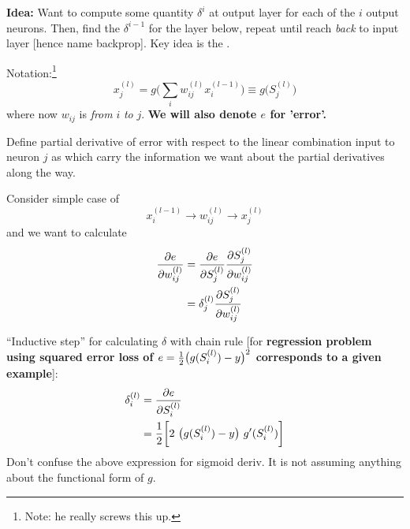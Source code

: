 \documentclass[12pt]{article}
\begin{document}
\begin{compactitem}[$\rightarrow$]
	\item \textbf{Idea:} Want to compute some quantity $\delta^i$ at output layer for each of the $i$ output neurons. Then, find the $\delta^{i - 1}$ for the layer below, repeat until reach \textit{back} to input layer [hence name backprop]. Key idea is the . 
	
	\item Notation:\footnote{Note: he really screws this up.}  $$ x_j^{(l)} = g\bigg( \sum_i w_{ij}^{(l)} x_i^{(l - 1)}\bigg)  \equiv g\bigg( S_j^{(l)}\bigg) $$ where now $w_{ij}$ is \textit{from} $i$ \textit{to} $j$. \textbf{We will also denote $e$ for 'error'. }
	
	\item Define partial derivative of error with respect to the linear combination input to neuron $j$ as
	which carry the information we want about the partial derivatives along the way. 
	
	\item Consider simple case of $$x_i^{(l - 1)} \rightarrow w_{ij}^{(l)} \rightarrow x_j^{(l)} $$ and we want to calculate 
	\begin{align}
	\frac{\partial e}{\partial w_{ij}^{(l)}} &= 	\frac{\partial e}{\partial S_{j}^{(l)}} \frac{\partial S_j^{(l)}}{\partial w_{ij}^{(l)}}  \\
	&=   \delta_j^{(l)}  \frac{\partial S_j^{(l)}}{\partial w_{ij}^{(l)}}  
	\end{align} 
	
	\item ``Inductive step'' for calculating $\delta$ with chain rule [for \textbf{regression problem using squared error loss of $e = \frac{1}{2} \big( g(S_i^{(l)}) - y\big)^2$ corresponds to a given example}]:
	\begin{align}
		\delta_i^{(l)}   &= \frac{\partial e}{\partial S_i^{(l)}} \\
		&= \frac{1}{2} \bigg[ 2 ~ \big( g(S_i^{(l)}) - y\big) ~ g'(S_i^{(l)}) \bigg]
	\end{align}
	Don't confuse the above expression for sigmoid deriv. It is not assuming anything about the functional form of $g$. 
	
\end{compactitem}

\end{document}
